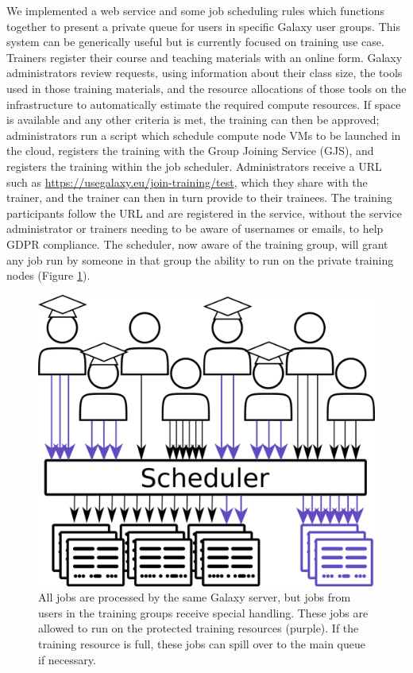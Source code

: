 \documentclass[a4paper,num-refs]{oup-contemporary}
\begin{document}
We implemented a web service and some job scheduling rules which functions together to present a private queue for users in specific Galaxy user groups. This system can be generically useful but is currently focused on training use case. Trainers register their course and teaching materials with an online form. Galaxy administrators review requests, using information about their class size, the tools used in those training materials, and the resource allocations of those tools on the infrastructure to automatically estimate the required compute resources. If space is available and any other criteria is met, the training can then be approved; administrators run a script which schedule compute node VMs to be launched in the cloud, registers the training with the Group Joining Service (GJS), and registers the training within the job scheduler. Administrators receive a URL such as \url{https://usegalaxy.eu/join-training/test}, which they share with the trainer, and the trainer can then in turn provide to their trainees. The training participants follow the URL and are registered in the service, without the service administrator or trainers needing to be aware of usernames or emails, to help GDPR compliance. The scheduler, now aware of the training group, will grant any job run by someone in that group the ability to run on the private training nodes (Figure \ref{figure:queue}).

\begin{figure}[bt!]
\centering
\includegraphics[width=\linewidth]{images/rules.png}
\caption{All jobs are processed by the same Galaxy server, but jobs from users in the training groups receive special handling. These jobs are allowed to run on the protected training resources (purple). If the training resource is full, these jobs can spill over to the main queue if necessary.}\label{figure:queue}
\end{figure}
\end{document}
